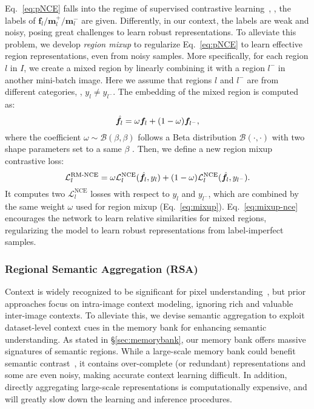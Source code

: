 \documentclass[10pt,twocolumn,letterpaper]{article}
\begin{document}
Eq.$_{\!}$~\ref{eq:pNCE} falls into the regime of supervised contrastive learning~\cite{khosla2020supervised}, \ie, the labels of {$\bm{f}_l/\bm{m}_l^{+}/\bm{m}_l^{-}$} are given. Differently, in our context, the labels are weak and noisy, posing great challenges  to learn robust representations. 
To alleviate this problem, we develop \emph{region mixup} to regularize Eq.~\ref{eq:pNCE} to learn effective region representations, even from noisy samples. More specifically, for each region $l$ in $I$, we create a mixed region by linearly combining it with a region $l^{-}$ in another mini-batch image. Here we assume that  regions $l$ and $l^-$ are from different categories, \ie, $y_{l}\!\neq\!y_{l^-}$. The embedding of the mixed region  is computed as:
\vspace{-3pt}
\begin{equation}\small\label{eq:mixup}
	\hat{\bm{f}}_l = \omega \bm{f}_l + (1 - \omega) \bm{f}_{l^-},
	\vspace{-1pt}
\end{equation}
where the coefficient $\omega\!\sim\!\mathcal{B}(\beta, \beta)$ follows a Beta distribution $\mathcal{B}(\cdot,\cdot)$ with two shape parameters set to a same $\beta$ \cite{zhang2018mixup}. Then, we define a new region mixup contrastive loss:
\begin{equation}\small\label{eq:mixup-nce}
	\mathcal{L}_l^{\text{RM-NCE}} = \omega \mathcal{L}_l^{\text{NCE}} (\hat{\bm{f}}_l , y_l) + (1  - \omega) \mathcal{L}_l^{\text{NCE}} (\hat{\bm{f}}_l , y_{l^-}).
\end{equation}
It computes two $\mathcal{L}_l^{\text{NCE}}$ losses with respect to $y_l$ and $y_{l^-}$, which are  combined  by the same weight $\omega$ used for region mixup (Eq.~\ref{eq:mixup}). Eq.~\ref{eq:mixup-nce} encourages the network to learn relative similarities for mixed regions, regularizing the model to learn robust representations from label-imperfect samples.



\subsubsection{Regional Semantic Aggregation (RSA)}\label{sec:rsa}

Context is widely recognized to be significant for pixel understanding~\cite{zhang2018context,yuan2020object,jin2021mining}, but prior approaches focus on intra-image context modeling, ignoring rich and valuable inter-image contexts. To alleviate this, we devise semantic aggregation to exploit dataset-level context cues in the memory bank for enhancing semantic understanding.  As stated in \S\ref{sec:memorybank}, our memory bank offers massive  signatures of semantic regions. While a large-scale memory bank could benefit semantic contrast~\cite{he2020momentum}, it contains over-complete (or redundant) representations and some are even noisy, making accurate context learning difficult. In addition, directly aggregating large-scale representations is computationally expensive, and  will greatly slow down the learning and inference procedures. 
\end{document}
